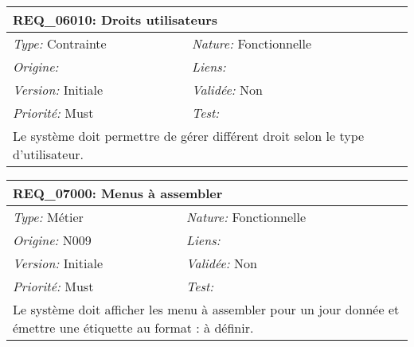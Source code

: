 \begin{table}[!h]

\begin{tabular}{|p{60mm}p{100mm}|}

\hline

\multicolumn{2}{|l|}{\textbf{REQ\_06010:} Droits utilisateurs} \\ \hline

\emph{Type:} Contrainte & \emph{Nature:} Fonctionnelle \\

\emph{Origine:}  & \emph{Liens:}  \\

\emph{Version:} Initiale & \emph{Validée:} Non \\

\emph{Priorité:} Must & \emph{Test:} \\ \hline

\multicolumn{2}{|p{16cm}|}{Le système doit permettre de gérer différent droit selon le type d'utilisateur.} \\ \hline

\end{tabular}

\end{table}



\begin{table}[!h]

\begin{tabular}{|p{60mm}p{100mm}|}

\hline

\multicolumn{2}{|l|}{\textbf{REQ\_07000:} Menus à assembler} \\ \hline

\emph{Type:} Métier & \emph{Nature:} Fonctionnelle \\

\emph{Origine:} N009 & \emph{Liens:}  \\

\emph{Version:} Initiale & \emph{Validée:} Non \\

\emph{Priorité:} Must & \emph{Test:} \\ \hline

\multicolumn{2}{|p{16cm}|}{Le système doit afficher les menu à assembler pour un jour donnée et émettre une étiquette au format : à définir.} \\ \hline

\end{tabular}

\end{table}



